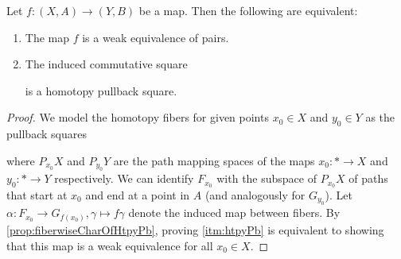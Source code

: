\begin{lemma}\label{lem:weOfaPairsIsHtpyPb}
    Let $f\colon(X,A)\to (Y,B)$ be a map.
    Then the following are equivalent:
    \begin{enumerate}[label={(\roman*)}]
        \item The map $f$ is a weak equivalence of pairs. \label{itm:weOfPairs}
        \item The induced commutative square \begin{center} 
        \end{center}
        is a homotopy pullback square. \label{itm:htpyPb}
    \end{enumerate}
    \begin{proof}
        We model the homotopy fibers for given points $x_0\in X$ and $y_0\in Y$ as the pullback squares
        \begin{center} 
        \end{center}
        where $P_{x_0}X$ and $P_{y_0}Y$ are the path mapping spaces of the maps $x_0\colon *\to X$ and  $y_0\colon *\to Y$ respectively.
        We can identify $F_{x_0}$ with the subspace of $P_{x_0}X$ of paths that start at $x_0$ and end at a point in $A$ (and analogously for $G_{y_0}$).
        Let $\alpha\colon F_{x_0}\to G_{f(x_0)}, \gamma\mapsto f\gamma$ denote the induced map between fibers.
        By \cref{prop:fiberwiseCharOfHtpyPb}, proving \ref{itm:htpyPb} is equivalent to showing that this map is a weak equivalence for all $x_0\in X$.


\end{proof}
\end{lemma}
